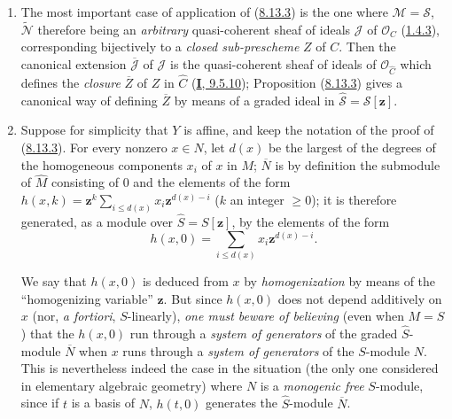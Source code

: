 \begin{remark}[8.13.4]
\label{II.8.13.4}
\begin{enumerate}
  \item[\rm{(i)}] The most important case of application of
  (\hyperref[II.8.13.3]{8.13.3}) is the one where
  $\mathcal{M}=\mathcal{S}$, $\widetilde{\mathcal{N}}$ therefore being an
  \emph{arbitrary} quasi-coherent sheaf of ideals $\mathcal{J}$ of
  $\mathcal{O}_C$ (\hyperref[II.1.4.3]{1.4.3}), corresponding
  bijectively to a \emph{closed sub-prescheme} $Z$ of $C$. Then the
  canonical extension $\overline{\mathcal{J}}$ of $\mathcal{J}$ is the
  quasi-coherent sheaf of ideals of $\mathcal{O}_{\widehat{C}}$ which defines
  the \emph{closure} $\overline{Z}$ of $Z$ in $\widehat{C}$
  (\hyperref[I.9.5.10]{\textbf{I}, 9.5.10}); Proposition
  (\hyperref[II.8.13.3]{8.13.3}) gives a canonical way of defining
  $\overline{Z}$ by means of a graded ideal in
  $\widehat{\mathcal{S}}=\mathcal{S}[\mathbf{z}]$.
  \item[\rm{(ii)}] Suppose for simplicity that $Y$ is affine, and keep
  the notation of the proof of
  (\hyperref[II.8.13.3]{8.13.3}). For every nonzero $x\in N$, let $d(x)$
  be the largest of the degrees of the homogeneous components $x_i$ of $x$ in
  $M$; $\overline{N}$ is by definition the submodule of $\widehat{M}$
  consisting of $0$ and the elements of the form
  $h(x,k)=\mathbf{z}^k\sum_{i\leqslant d(x)}x_i \mathbf{z}^{d(x)-i}$ ($k$ an integer
  $\geqslant0$); it is therefore generated, as a module over
  $\widehat{S}=S[\mathbf{z}]$, by the elements of the form
  \[
    h(x,0)=\sum_{i\leqslant d(x)}x_i \mathbf{z}^{d(x)-i}.
  \]

  We say that $h(x,0)$ is deduced from $x$ by \emph{homogenization} by
  means of the ``homogenizing variable'' $\mathbf{z}$. But since $h(x,0)$ does not
  depend additively on $x$ (nor, \emph{a fortiori}, $S$-linearly), \emph{one
  must beware of believing} (even when $M=S$) that the $h(x,0)$ run through a
  \emph{system of generators} of the graded $\widehat{S}$-module
  $\overline{N}$ when $x$ runs through a \emph{system of
  generators} of the $S$-module $N$. This is nevertheless indeed the case in
  the situation (the only one considered in elementary algebraic geometry)
  where $N$ is a \emph{monogenic free} $S$-module, since if $t$ is a basis of
  $N$, $h(t,0)$ generates the $\widehat{S}$-module $\overline{N}$.
\end{enumerate}
\end{remark}


